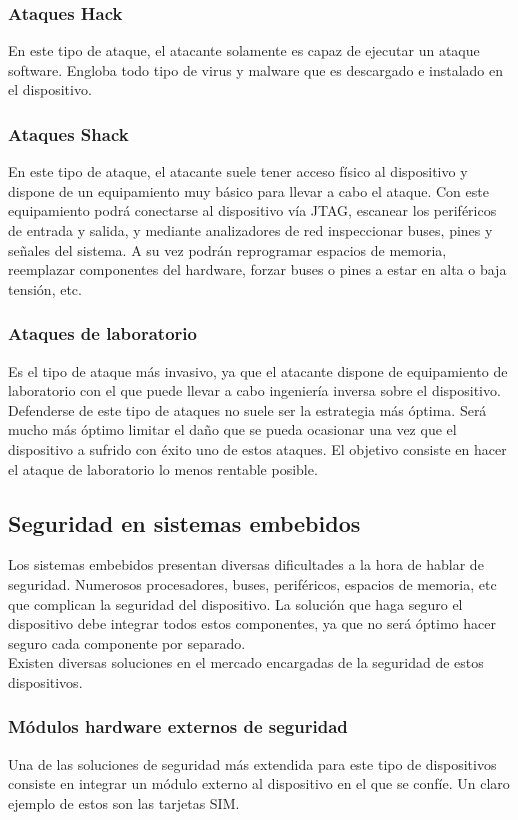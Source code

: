 \subsubsection{Ataques Hack}
En este tipo de ataque, el atacante solamente es capaz de ejecutar un ataque software. Engloba todo tipo de virus y malware que es descargado e instalado en el dispositivo.

\subsubsection{Ataques Shack}
En este tipo de ataque, el atacante suele tener acceso físico al dispositivo y dispone de un equipamiento muy básico para llevar a cabo el ataque. Con este equipamiento podrá conectarse al dispositivo vía JTAG, escanear los periféricos de entrada y salida, y mediante analizadores de red inspeccionar buses, pines y señales del sistema. A su vez podrán reprogramar espacios de memoria, reemplazar componentes del hardware, forzar buses o pines a estar en alta o baja tensión, etc.

\subsubsection{Ataques de laboratorio}
Es el tipo de ataque más invasivo, ya que el atacante dispone de equipamiento de laboratorio con el que puede llevar a cabo ingeniería inversa sobre el dispositivo. Defenderse de este tipo de ataques no suele ser la estrategia más óptima. Será mucho más óptimo limitar el daño que se pueda ocasionar una vez que el dispositivo a sufrido con éxito uno de estos ataques. El objetivo consiste en hacer el ataque de laboratorio lo menos rentable posible.

\subsection{Seguridad en sistemas embebidos}
Los sistemas embebidos presentan diversas dificultades a la hora de hablar de seguridad. Numerosos procesadores, buses, periféricos, espacios de memoria, etc que complican la seguridad del dispositivo. La solución que haga seguro el dispositivo debe integrar todos estos componentes, ya que no será óptimo hacer seguro cada componente por separado. \\
Existen diversas soluciones en el mercado encargadas de la seguridad de estos dispositivos.

\subsubsection{Módulos hardware externos de seguridad}
Una de las soluciones de seguridad más extendida para este tipo de dispositivos consiste en integrar un módulo externo al dispositivo en el que se confíe. Un claro ejemplo de estos son las tarjetas SIM.

